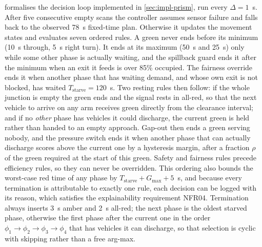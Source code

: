  formalises the decision loop implemented in \cref{sec:impl-prism}, run every $\Delta=1$~s. After five consecutive empty scans the controller assumes sensor failure and falls back to the observed 78~s fixed-time plan. Otherwise it updates the movement states and evaluates seven ordered rules. A green never ends before its minimum (10~s through, 5~s right turn). It ends at its maximum (50~s and 25~s) only while some other phase is actually waiting, and the spillback guard ends it after the minimum when an exit it feeds is over 85\% occupied. The fairness override ends it when another phase that has waiting demand, and whose own exit is not blocked, has waited $T_{\mathrm{starve}}=120$~s. Two resting rules then follow: if the whole junction is empty the green ends and the signal rests in all-red, so that the next vehicle to arrive on any arm receives green directly from the clearance interval; and if no \emph{other} phase has vehicles it could discharge, the current green is held rather than handed to an empty approach. Gap-out then ends a green serving nobody, and the pressure switch ends it when another phase that can actually discharge scores above the current one by a hysteresis margin, after a fraction $\rho$ of the green required at the start of this green. Safety and fairness rules precede efficiency rules, so they can never be overridden. This ordering also bounds the worst-case red time of any phase by $T_{\mathrm{starve}}+G_{\max}+5$~s, and because every termination is attributable to exactly one rule, each decision can be logged with its reason, which satisfies the explainability requirement NFR04. Termination always inserts 3~s amber and 2~s all-red; the next phase is the oldest starved phase, otherwise the first phase after the current one in the order $\phi_1\rightarrow\phi_2\rightarrow\phi_3\rightarrow\phi_4$ that has vehicles it can discharge, so that selection is cyclic with skipping rather than a free arg-max.

